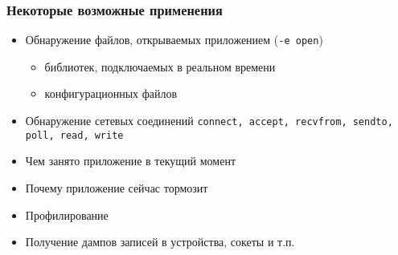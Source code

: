 \begin{frame}
 \frametitle{Некоторые возможные применения}
 \begin{itemize}
  \item Обнаружение файлов, открываемых приложением (\texttt{-e open})
    \begin{itemize}
      \item библиотек, подключаемых в реальном времени
      \item конфигурационных файлов
    \end{itemize}
   \item Обнаружение сетевых соединений \texttt{connect, accept, recvfrom, sendto, poll, read, write} 
   \item Чем занято приложение в текущий момент
   \item Почему приложение сейчас тормозит
   \item Профилирование
   \item Получение дампов записей в устройства, сокеты и т.п.
 \end{itemize}
\end{frame}


